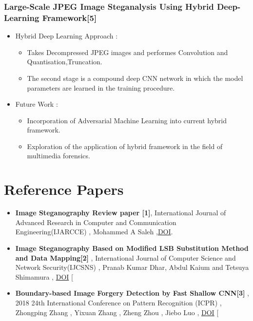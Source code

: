 \documentclass{beamer} %
\theoremstyle{definition} %
\begin{document}
\begin{frame}
\frametitle{Large-Scale JPEG Image Steganalysis Using Hybrid Deep-Learning Framework[5]  }
\begin{itemize}
\item Hybrid Deep Learning Approach :
\begin{itemize}
	\item Takes Decompressed JPEG images and performes Convolution and Quantisation,Truncation.
	\item The second stage is a compound deep CNN network in which the model parameters are learned in the training procedure. 
\end{itemize}
\item Future Work : 
\begin{itemize}
	\item Incorporation of Adversarial Machine Learning into current hybrid framework. 
	\item Exploration of the application of hybrid framework in
	the field of multimedia forensics. 
\end{itemize}
\end{itemize}
\end{frame}

\iffalse

\begin{frame}
\frametitle{Large-Scale JPEG Image Steganalysis Using Hybrid Deep-Learning Framework[5].}

\begin{figure}
	\texttt{[image: jpegStegAnalysis.png]}
	\caption{Hybrid Deep Learning Framework}
\end{figure}
\end{frame}
\fi
\section{Reference Papers}

\begin{itemize}
	\item{\textbf{Image Steganography Review paper [1]}, International Journal of Advanced Research in Computer and Communication Engineering(IJARCCE) , Mohammed A  Saleh ,\href{https://ijarcce.com/wp-content/uploads/2018/10/IJARCCE.2018.7910.pdf} {DOI}. }
\end{itemize}

\begin{itemize}
	\item{\textbf{Image Steganography Based on Modified LSB Substitution Method and Data Mapping[2]} ,   International Journal of Computer Science and Network Security(IJCSNS) , Pranab Kumar Dhar, Abdul Kaium and Tetsuya Shimamura , \href{http://paper.ijcsns.org/07_book/201803/20180321.pdf}{DOI} [ }
	\end{itemize}
\begin{itemize}
	\item{\textbf{Boundary-based Image Forgery Detection by Fast Shallow CNN[3]} , 2018 24th International Conference on Pattern Recognition (ICPR) , Zhongping Zhang , Yixuan Zhang , Zheng Zhou , Jiebo Luo , \href{https://doi.org/10.1109/ICPR.2018.8545074} {DOI} [  }

\end{itemize}
\end{document}
